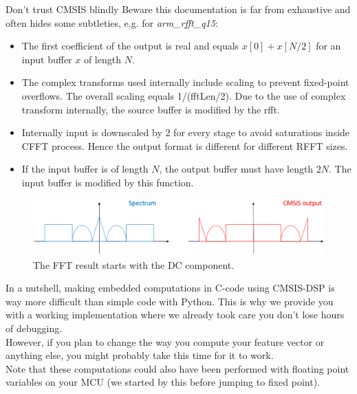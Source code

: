 \begin{bclogo}[couleur = gray!20, arrondi = 0.2, logo=\bcattention]{Don't trust CMSIS blindly}
Beware this documentation is far from exhaustive and often hides some subtleties, e.g. for \emph{arm\_rfft\_q15}:
%
\begin{itemize}
    \item The first coefficient of the output is real and equals $x[0]+x[N/2]$ for an input buffer $x$ of length $N$.
    \item The complex transforms used internally include scaling to prevent fixed-point overflows. The overall scaling equals 1/(fftLen/2). Due to the use of complex transform internally, the source buffer is modified by the rfft.
    \item Internally input is downscaled by 2 for every stage to avoid saturations inside CFFT process. Hence the output format is different for different RFFT sizes.
    \item If the input buffer is of length $N$, the output buffer must have length $2N$. The input buffer is modified by this function.
\end{itemize}
%
\begin{figure}[H]
\centering
\includegraphics[width=\textwidth-4cm]{figs/CMSIS_output.PNG}
\caption{The FFT result starts with the DC component.}
\label{fig:CMSIS_output}
\end{figure}
\end{bclogo}
%
In a nutshell, making embedded computations in C-code using CMSIS-DSP is way more difficult than simple code with Python. This is why we provide you with a working implementation where we already took care you don't lose hours of debugging. \\
However, if you plan to change the way you compute your feature vector or anything else, you might probably take this time for it to work. \\
Note that these computations could also have been performed with floating point variables on your MCU (we started by this before jumping to fixed point).
